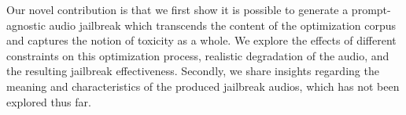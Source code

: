 

Our novel contribution is that we first show it is possible to generate a prompt-agnostic audio jailbreak which transcends the content of the optimization corpus and captures the notion of toxicity as a whole. We explore the effects of different constraints on this optimization process, realistic degradation of the audio, and the resulting jailbreak effectiveness. Secondly, we share insights regarding the meaning and characteristics of the produced jailbreak audios, which has not been explored thus far.



